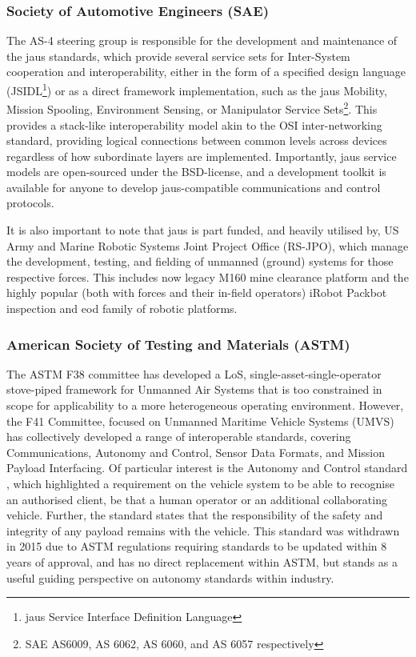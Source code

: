 \subsubsection{Society of Automotive Engineers (SAE)}

The AS-4 steering group is responsible for the development and maintenance of the \acrfull{jaus} standards, which provide several service sets for Inter-System cooperation and interoperability, either in the form of a specified design language (JSIDL\footnote{\acrshort{jaus} Service Interface Definition Language}) or as a direct framework implementation, such as the \acrshort{jaus} Mobility, Mission Spooling, Environment Sensing, or Manipulator Service Sets\footnote{SAE AS6009, AS 6062, AS 6060, and AS 6057 respectively}.
This provides a stack-like interoperability model akin to the OSI inter-networking standard, providing logical connections between common levels across devices regardless of how subordinate layers are implemented.
Importantly, \acrshort{jaus} service models are open-sourced under the BSD-license, and a development toolkit is available for anyone to develop \acrshort{jaus}-compatible communications and control protocols\cite{JTS}.

It is also important to note that \acrshort{jaus} is part funded, and heavily utilised by, US Army and Marine Robotic Systems Joint Project Office (RS-JPO), which manage the development, testing, and fielding of unmanned (ground) systems for those respective forces.
This includes now legacy M160 mine clearance platform and the highly popular (both with forces and their in-field operators) iRobot Packbot inspection and \acrfull{eod} family of robotic platforms.

\subsubsection{American Society of Testing and Materials (ASTM)}

The ASTM F38 committee has developed a LoS, single-asset-single-operator stove-piped framework for Unmanned Air Systems that is too constrained in scope for applicability to a more heterogeneous operating environment\cite{AmericanSocietyofTestingandMaterials2007}.
However, the F41 Committee, focused on Unmanned Maritime Vehicle Systems (UMVS) has collectively developed a range of interoperable standards, covering Communications, Autonomy and Control, Sensor Data Formats, and Mission Payload Interfacing.
Of particular interest is the Autonomy and Control standard \cite{AmericanSocietyofTestingandMaterials2006}, which highlighted a requirement on the vehicle system to be able to recognise an authorised client, be that a human operator or an additional collaborating vehicle.
Further, the standard states that the responsibility of the safety and integrity of any payload remains with the vehicle.
This standard was withdrawn in 2015 due to ASTM regulations requiring standards to be updated within 8 years of approval, and has no direct replacement within ASTM, but stands as a useful guiding perspective on autonomy standards within industry.


